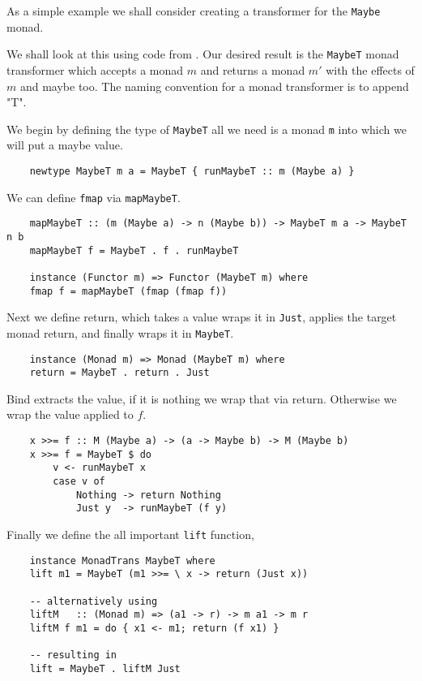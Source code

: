\begin{example}
    As a simple example we shall consider
    creating a transformer for the \texttt{Maybe} monad.

    We shall look at this using code from \cite{haskellT}.
    Our desired result is the \texttt{MaybeT} monad transformer
    which accepts a monad $m$ and returns a monad $m\prime$
    with the effects of $m$ and maybe too.
    The naming convention for a monad transformer is to append "T".

    We begin by defining the type of \texttt{MaybeT}
    all we need is a monad \texttt{m} into which we will
    put a maybe value.
    \begin{verbatim}
    newtype MaybeT m a = MaybeT { runMaybeT :: m (Maybe a) }
    \end{verbatim}

    We can define \texttt{fmap} via \texttt{mapMaybeT}.
    \begin{verbatim}
    mapMaybeT :: (m (Maybe a) -> n (Maybe b)) -> MaybeT m a -> MaybeT n b
    mapMaybeT f = MaybeT . f . runMaybeT

    instance (Functor m) => Functor (MaybeT m) where
    fmap f = mapMaybeT (fmap (fmap f))
    \end{verbatim}
    Next we define return,
    which takes a value wraps it in \texttt{Just},
    applies the target monad return,
    and finally wraps it in \texttt{MaybeT}.
    \begin{verbatim}
    instance (Monad m) => Monad (MaybeT m) where
    return = MaybeT . return . Just
    \end{verbatim}

    Bind extracts the value,
    if it is nothing we wrap that via return.
    Otherwise we wrap the value applied to $f$.
    \begin{verbatim}
    x >>= f :: M (Maybe a) -> (a -> Maybe b) -> M (Maybe b)
    x >>= f = MaybeT $ do
        v <- runMaybeT x
        case v of
            Nothing -> return Nothing
            Just y  -> runMaybeT (f y)
    \end{verbatim}
    Finally we define the all important \texttt{lift} function,
    \begin{verbatim}
    instance MonadTrans MaybeT where
    lift m1 = MaybeT (m1 >>= \ x -> return (Just x))

    -- alternatively using
    liftM   :: (Monad m) => (a1 -> r) -> m a1 -> m r
    liftM f m1 = do { x1 <- m1; return (f x1) }

    -- resulting in
    lift = MaybeT . liftM Just
    \end{verbatim}
\end{example}

